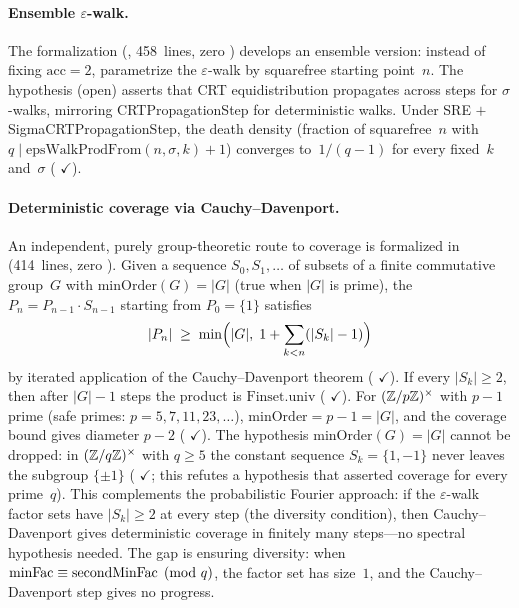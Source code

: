 \paragraph{Ensemble $\varepsilon$-walk.}
The formalization
(, 458~lines, zero )
develops an ensemble version: instead of fixing $\mathrm{acc} = 2$,
parametrize the $\varepsilon$-walk by squarefree starting point~$n$.
The  hypothesis (open) asserts that
CRT equidistribution propagates across steps for $\sigma$-walks,
mirroring CRTPropagationStep for deterministic walks.
Under SRE $+$ SigmaCRTPropagationStep, the death density (fraction of
squarefree~$n$ with $q \mid \mathrm{epsWalkProdFrom}(n,\sigma,k)+1$)
converges to~$1/(q{-}1)$ for every fixed~$k$ and~$\sigma$
(
{\color{leanink}$\checkmark$}).

\paragraph{Deterministic coverage via Cauchy--Davenport.}
An independent, purely group-theoretic route to coverage is formalized in
 (414~lines, zero ).
Given a sequence $S_0, S_1, \ldots$ of subsets of a finite commutative
group~$G$ with $\mathrm{minOrder}(G) = |G|$ (true when $|G|$ is prime),
the  $P_n = P_{n-1} \cdot S_{n-1}$ starting
from $P_0 = \{1\}$ satisfies
\[
  |P_n| \;\geq\; \min\Bigl(|G|,\; 1 + \sum_{k<n}(|S_k| - 1)\Bigr)
\]
by iterated application of the Cauchy--Davenport theorem
(
{\color{leanink}$\checkmark$}).
If every $|S_k| \geq 2$, then after $|G| - 1$ steps the product is
$\mathrm{Finset.univ}$
(
{\color{leanink}$\checkmark$}).
For $(\mathbb{Z}/p\mathbb{Z})^\times$ with $p{-}1$ prime (safe primes: $p = 5, 7, 11, 23, \ldots$),
$\mathrm{minOrder} = p{-}1 = |G|$, and the coverage bound gives diameter
$p - 2$
(
{\color{leanink}$\checkmark$}).
The hypothesis $\mathrm{minOrder}(G) = |G|$ cannot be dropped: in
$(\mathbb{Z}/q\mathbb{Z})^\times$ with $q \geq 5$ the constant sequence
$S_k = \{1, -1\}$ never leaves the subgroup $\{\pm 1\}$
(
{\color{leanink}$\checkmark$}; this refutes a hypothesis
 that asserted coverage for every prime~$q$).
This complements the probabilistic Fourier approach: if the
$\varepsilon$-walk factor sets have $|S_k| \geq 2$ at every step (the
diversity condition), then Cauchy--Davenport gives deterministic coverage
in finitely many steps---no spectral hypothesis needed.  The gap is
ensuring diversity: when $\mathrm{minFac} \equiv \operatorname{secondMinFac}
\pmod{q}$, the factor set has size~$1$, and the Cauchy--Davenport
step gives no progress.

